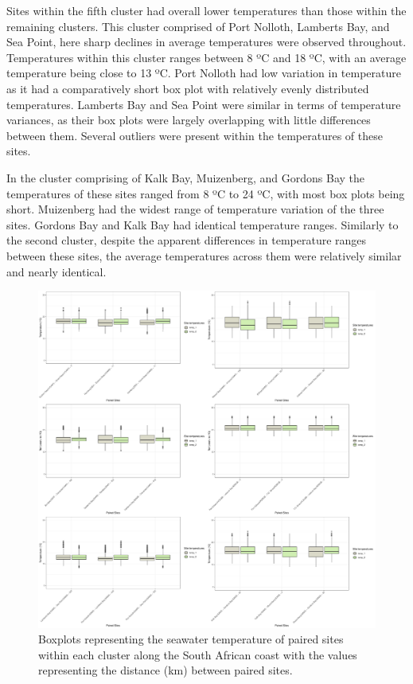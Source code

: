\documentclass[12pt,A4paper,]{article}
\begin{document}
Sites within the fifth cluster had overall lower temperatures than those
within the remaining clusters. This cluster comprised of Port Nolloth,
Lamberts Bay, and Sea Point, here sharp declines in average temperatures
were observed throughout. Temperatures within this cluster ranges
between 8 ºC and 18 ºC, with an average temperature being close to 13
ºC. Port Nolloth had low variation in temperature as it had a
comparatively short box plot with relatively evenly distributed
temperatures. Lamberts Bay and Sea Point were similar in terms of
temperature variances, as their box plots were largely overlapping with
little differences between them. Several outliers were present within
the temperatures of these sites.

In the cluster comprising of Kalk Bay, Muizenberg, and Gordons Bay the
temperatures of these sites ranged from 8 ºC to 24 ºC, with most box
plots being short. Muizenberg had the widest range of temperature
variation of the three sites. Gordons Bay and Kalk Bay had identical
temperature ranges. Similarly to the second cluster, despite the
apparent differences in temperature ranges between these sites, the
average temperatures across them were relatively similar and nearly
identical.

\begin{figure}
\centering
\includegraphics{../figures/combined_plot.pdf}
\caption{Boxplots representing the seawater temperature of paired sites
within each cluster along the South African coast with the values
representing the distance (km) between paired sites.}
\end{figure}
\end{document}
